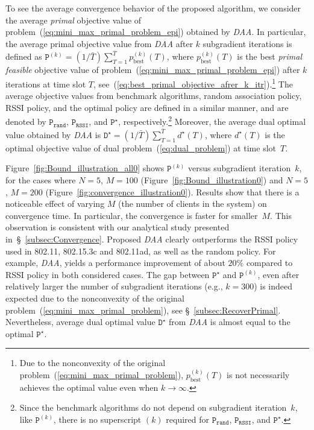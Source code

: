\documentclass[journal, 10pt, twocolumn]{IEEEtran}
\begin{document}
To see the average convergence behavior of the proposed algorithm, we consider the average \emph{primal} objective value of problem~(\ref{eq:mini_max_primal_problem_epi}) obtained by \emph{DAA}. In particular, the average primal objective value from \emph{DAA} after $k$ subgradient iterations is defined as $\texttt{P}^{(k)} = (1/\bar T)\sum_{T=1}^{\bar T}p^{(k)}_{\mathrm{best}}(T)$, where $p^{(k)}_{\mathrm{best}}(T)$ is the best \emph{primal feasible} objective value of problem~(\ref{eq:mini_max_primal_problem_epi}) after $k$ iterations at time slot $T$, see~(\ref{eq:best_primal_objective_afrer_k_itr}).\footnote{Due to the nonconvexity of the original problem~(\ref{eq:mini_max_primal_problem}), $p^{(k)}_{\mathrm{best}}(T)$ is not necessarily achieves the optimal value even when $k\rightarrow\infty$.} The average objective values from benchmark algorithms, random association policy, RSSI policy, and the optimal policy are defined in a similar manner, and are denoted by $\texttt{P}_{\texttt{rand}}$, $\texttt{P}_{\texttt{RSSI}}$, and $\texttt{P}^\star$, respectively.\footnote{Since the benchmark algorithms do not depend on subgradient iteration~$k$, like $\texttt{P}^{(k)}$, there is no superscript $(k)$ required for $\texttt{P}_{\texttt{rand}}$, $\texttt{P}_{\texttt{RSSI}}$, and $\texttt{P}^\star$.} Moreover, the average dual optimal value obtained by \emph{DAA} is $\texttt{D}^\star= (1/\bar T)\sum_{T=1}^{\bar T}d^\star(T)$, where $d^\star(T)$ is the optimal objective value of dual problem~(\ref{eq:dual_problem}) at time slot~$T$.



Figure~\ref{fig:Bound_illustration_all0} shows $\texttt{P}^{(k)}$ versus subgradient iteration~$k$, for the cases where $N=5$, $M=100$ (Figure~\ref{fig:Bound_illustration0}) and $N=5$, $M=200$ (Figure~\ref{fig:convergence_illustration0}). Results show that there is a noticeable effect of varying $M$ (the number of clients in the system) on convergence time. In particular, the convergence is faster for smaller~$M$. This observation is consistent with our analytical study presented in~\S~\ref{subsec:Convergence}. Proposed \emph{DAA} clearly outperforms the RSSI policy used in 802.11, 802.15.3c and 802.11ad, as well as the random policy. For example, \emph{DAA}, yields a performance improvement of about $20\%$ compared to RSSI policy in both considered cases. The gap between $\texttt{P}^\star$ and $\texttt{P}^{(k)}$, even after relatively larger the number of subgradient iterations (e.g., $k=300$) is indeed expected due to the nonconvexity of the original problem~(\ref{eq:mini_max_primal_problem}), see \S~\ref{subsec:RecoverPrimal}. Nevertheless, average dual optimal value $\texttt{D}^\star$ from \emph{DAA} is almost equal to the optimal $\texttt{P}^\star$.
\end{document}
